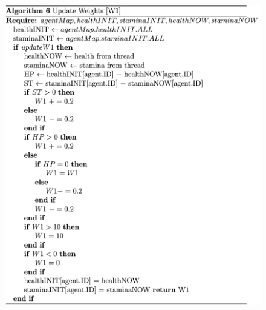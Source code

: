 

\begin{figure}[htb]
    \centering
    \includegraphics[scale=0.7]{006_team_3_agent_design/FIGS/Algo6.png}
    \label{fig:algo6}
\end{figure}

